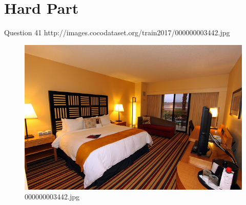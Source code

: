 \section{Hard Part}
Question 41
http://images.cocodataset.org/train2017/000000003442.jpg
\begin{figure}[h]
    \centering
    \includegraphics[width=0.8\linewidth]{../image set/hard/000000003442.jpg}
    \caption{000000003442.jpg}
\end{figure}
